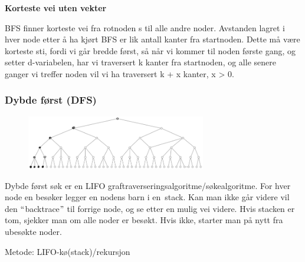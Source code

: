 \documentclass[12pt]{report}
\begin{document}
\vspace{\baselineskip}
{\fontsize{14pt}{16.8pt}\selectfont \textbf{Korteste vei uten vekter }\par}\par

BFS finner korteste vei fra rotnoden s til alle andre noder. Avstanden lagret i hver node etter å ha kjørt BFS er lik antall kanter fra startnoden. Dette må være korteste sti, fordi vi går bredde først, så når vi kommer til noden første gang, og setter d-variabelen, har vi traversert k kanter fra startnoden, og alle senere ganger vi treffer noden vil vi ha traversert k + x kanter, x > 0. \par




\newpage

\vspace{\baselineskip}\setlength{\parskip}{6.0pt}
\subsubsection*{Dybde først (DFS)}



\begin{figure}[H]
\advance\leftskip 3.22in		\includegraphics[width=3.08in,height=0.93in]{./media/image99.png}
\end{figure}



\setlength{\parskip}{0.0pt}
Dybde først søk er en LIFO graftraverseringsalgoritme/søkealgoritme. For hver node en besøker legger en nodens barn i en stack. Kan man ikke går videre vil den $``$backtrace$"$  til forrige node, og se etter en mulig vei videre. Hvis stacken er tom, sjekker man om alle noder er besøkt. Hvis ikke, starter man på nytt fra ubesøkte noder. \par

Metode: LIFO-kø(stack)/rekursjon\par
\end{document}
